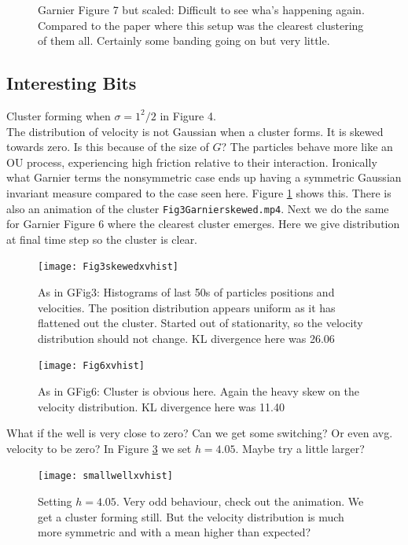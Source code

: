 \documentclass[11pt,a4paper, final, dvipsnames]{article}
\begin{document}
\begin{figure}
\begin{minipage}[b]{0.49\textwidth}
    \end{minipage}
    \caption{Garnier Figure 7 but scaled: Difficult to see wha's happening again. Compared to the paper where this setup was the clearest clustering of them all. Certainly some banding going on but very little.}
\end{figure}

\subsection{Interesting Bits}
Cluster forming when $\sigma =1^2/2$ in Figure 4.\\

The distribution of velocity is not Gaussian when a cluster forms. It is skewed towards zero. Is this because of the size of $G$? The particles behave more like an OU process, experiencing high friction relative to their interaction. Ironically what Garnier terms the nonsymmetric case ends up having a symmetric Gaussian invariant measure compared to the case seen here. Figure \ref{fig:skewhist} shows this. There is also an animation of the cluster \texttt{Fig3Garnierskewed.mp4}. Next we do the same for Garnier Figure 6 where the clearest cluster emerges. Here we give distribution at final time step so the cluster is clear.
\begin{figure}\label{fig:skewhist}
    \centering
    \texttt{[image: Fig3skewedxvhist]}
    \caption{As in GFig3: Histograms of last 50s of particles positions and velocities. The position distribution appears uniform as it has flattened out the cluster. Started out of stationarity, so the velocity distribution should not change. KL divergence here was 26.06}
\end{figure}

\begin{figure}\label{fig:skewhist6}
    \centering
    \texttt{[image: Fig6xvhist]}
    \caption{As in GFig6: Cluster is obvious here. Again the heavy skew on the velocity distribution. KL divergence here was 11.40}
\end{figure}

What if the well is very close to zero? Can we get some switching? Or even avg. velocity to be zero? In Figure \ref{fig:smallwell} we set $h=4.05$. Maybe try a little larger?

\begin{figure}
    \centering
    \texttt{[image: smallwellxvhist]}
    \caption{Setting $h=4.05$. Very odd behaviour, check out the animation. We get a cluster forming still. But the velocity distribution is much more symmetric and with a mean higher than expected?}
    \label{fig:smallwell}
\end{figure}
\end{document}
